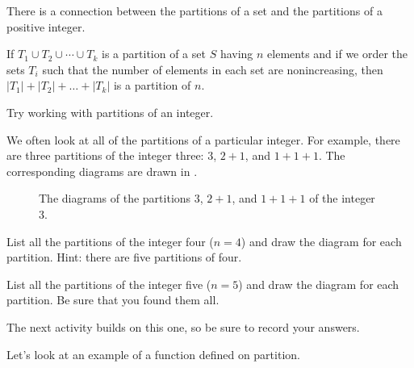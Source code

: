 There is a connection between the partitions of a set and the partitions of a positive integer.

\begin{rem}
\label{rem_part_sets_vs_integers}
    If $T_1 \cup T_2 \cup \cdots \cup T_k$ is a partition of a set $S$ having $n$ elements and if we order the sets $T_i$ such that the number of elements in each set are nonincreasing, then $|T_1|+|T_2|+ \ldots +|T_k|$ is a partition of $n$.
\end{rem}

Try working with partitions of an integer.

\begin{act}
\label{act_partition_integer}
    We often look at all of the partitions of a particular integer. For example, there are three partitions of the integer three: $3$, $2+1$, and $1+1+1$. The corresponding diagrams are drawn in .
        \begin{figure} [hbtp]
            \centering
             \hspace{.5in}       
            \hspace{.5in} 
            \caption{The diagrams of the partitions $3$, $2+1$, and $1+1+1$ of the integer 3.}
            \label{fig_partitions3}
        \end{figure} 
    \begin{actpart}
        \item \label{part_partitions4} List all the partitions of the integer four ($n=4$) and draw the diagram for each partition.  Hint: there are five partitions of four.
        \item \label{part_partitions5} List all the partitions of the integer five ($n=5$) and draw the diagram for each partition.  Be sure that you found them all.
    \end{actpart}
    The next activity builds on this one, so be sure to record your answers.
\end{act}

Let's look at an example of a function defined on partition.

